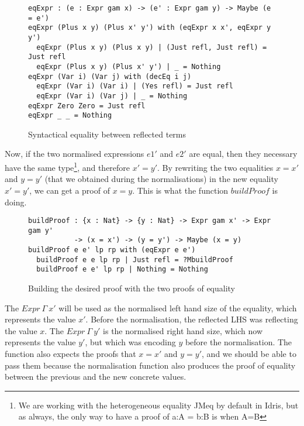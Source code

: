 \begin{figure}[H]
\figrule
\begin{center}
\begin{verbatim}
eqExpr : (e : Expr gam x) -> (e' : Expr gam y) -> Maybe (e = e')
eqExpr (Plus x y) (Plus x' y') with (eqExpr x x', eqExpr y y')
  eqExpr (Plus x y) (Plus x y) | (Just refl, Just refl) = Just refl
  eqExpr (Plus x y) (Plus x' y') | _ = Nothing
eqExpr (Var i) (Var j) with (decEq i j)
  eqExpr (Var i) (Var i) | (Yes refl) = Just refl
  eqExpr (Var i) (Var j) | _ = Nothing
eqExpr Zero Zero = Just refl
eqExpr _ _ = Nothing
\end{verbatim}
\end{center}
\caption{Syntactical equality between reflected terms}
\figrule
\end{figure}


Now, if the two normalised expressions $e1'$ and $e2'$ are equal, then they necessary have the same type\footnote{We are working with the heterogeneous equality JMeq by default in Idris, but as always, the only way to have a proof of a:A = b:B is when A=B}, and therefore $x'=y'$.
By rewriting the two equalities $x=x'$ and $y=y'$ (that we obtained during the normalisations) in the new equality $x'=y'$, we can get a proof of $x=y$. This is what the function $buildProof$ is doing.

\begin{figure}[H]
\figrule
\begin{center}
\begin{verbatim}
buildProof : {x : Nat} -> {y : Nat} -> Expr gam x' -> Expr gam y' 
           -> (x = x') -> (y = y') -> Maybe (x = y)
buildProof e e' lp rp with (eqExpr e e')
  buildProof e e lp rp | Just refl = ?MbuildProof
  buildProof e e' lp rp | Nothing = Nothing
\end{verbatim}
\end{center}
\caption{Building the desired proof with the two proofs of equality}
\figrule
\end{figure}


The $Expr\ \Gamma\ x'$ will be used as the normalised left hand size of the equality, which represents the value $x'$. Before the normalisation, the reflected LHS was reflecting the value $x$. The $Expr\ \Gamma\ y'$ is the normalised right hand size, which now represents the value $y'$, but which was encoding $y$ before the normalisation. The function also expects the proofs that $x=x'$ and $y=y'$, and we should be able to pass them because the normalisation function also produces the proof of equality between the previous and the new concrete values.


